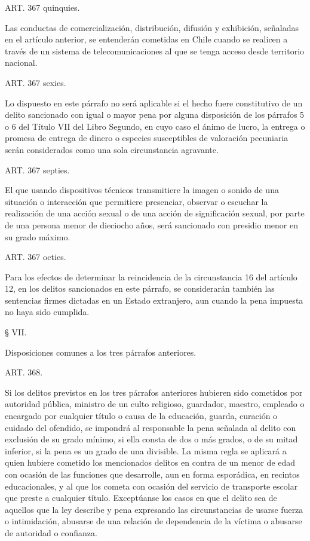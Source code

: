     ART. 367 quinquies.

    Las conductas de comercialización, distribución, difusión y exhibición, señaladas en el artículo anterior, se entenderán cometidas en Chile cuando se realicen a través de un sistema de telecomunicaciones al que se tenga acceso desde territorio nacional.


    ART. 367 sexies.

    Lo dispuesto en este párrafo no será aplicable si el hecho fuere constitutivo de un delito sancionado con igual o mayor pena por alguna disposición de los párrafos 5 o 6 del Título VII del Libro Segundo, en cuyo caso el ánimo de lucro, la entrega o promesa de entrega de dinero o especies susceptibles de valoración pecuniaria serán considerados como una sola circunstancia agravante.


    ART. 367 septies.

    El que usando dispositivos técnicos transmitiere la imagen o sonido de una situación o interacción que permitiere presenciar, observar o escuchar la realización de una acción sexual o de una acción de significación sexual, por parte de una persona menor de dieciocho años, será sancionado con presidio menor en su grado máximo.


    ART. 367 octies.
   
    Para los efectos de determinar la reincidencia de la circunstancia 16 del artículo 12, en los delitos sancionados en este párrafo, se considerarán también las sentencias firmes dictadas en un Estado extranjero, aun cuando la pena impuesta no haya sido cumplida.


    § VII.

    Disposiciones comunes a los tres párrafos anteriores.




    ART. 368.

    Si los delitos previstos en los tres párrafos anteriores hubieren sido cometidos por autoridad pública, ministro de un culto religioso, guardador, maestro, empleado o encargado por cualquier título o causa de la educación, guarda, curación o cuidado del ofendido, se impondrá al responsable la pena señalada al delito con exclusión de su grado mínimo, si ella consta de dos o más grados, o de su mitad inferior, si la pena es un grado de una divisible. La misma regla se aplicará a quien hubiere cometido los mencionados delitos en contra de un menor de edad con ocasión de las funciones que desarrolle, aun en forma esporádica, en recintos educacionales, y al que los cometa con ocasión del servicio de transporte escolar que preste a cualquier título.
    Exceptúanse los casos en que el delito sea de aquellos que la ley describe y pena expresando las circunstancias de usarse fuerza o intimidación, abusarse de una relación de dependencia de la víctima o abusarse de autoridad o confianza.





